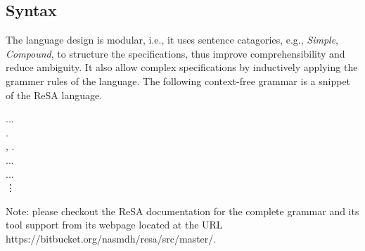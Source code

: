 \subsection*{Syntax}
The language design is modular, i.e., it uses sentence catagories, e.g., \textit{Simple}, \textit{Compound}, to structure the specifications, thus improve comprehensibility and reduce ambiguity. It also allow complex specifications by inductively applying the grammer rules of the language. The following context-free grammar is a snippet of the ReSA language. 
\begin{bnf*}
	{ \bnfor {}\bnfor{} ...}\\
	{ .} \\%
	{, .} \\%
	{\bnfor ...} \\%
	{  \bnfor...} \\%
	\vdots
\end{bnf*}
{\footnotesize Note: please checkout the ReSA documentation for the complete grammar and its tool support from its webpage located at the URL {https://bitbucket.org/nasmdh/resa/src/master/}. }
